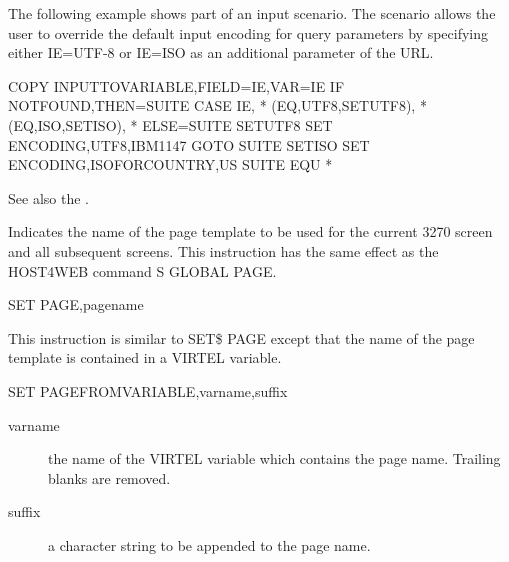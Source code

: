 \documentclass[letterpaper,10pt,english]{sphinxmanual}
\begin{document}
The following example shows part of an input scenario. The scenario allows the user to override the default input encoding for query parameters by specifying either IE=UTF-8 or IE=ISO as an additional parameter of the URL.

\begin{sphinxVerbatim}[commandchars=\\\{\}]
        COPY\PYGZdl{} INPUT\PYGZhy{}TO\PYGZhy{}VARIABLE,FIELD=\PYGZsq{}IE\PYGZsq{},VAR=\PYGZsq{}IE\PYGZsq{}
        IF\PYGZdl{} NOT\PYGZhy{}FOUND,THEN=SUITE
        CASE\PYGZdl{} \PYGZsq{}IE\PYGZsq{}, *
            (EQ,\PYGZsq{}UTF\PYGZhy{}8\PYGZsq{},SETUTF8),                      *
            (EQ,\PYGZsq{}ISO\PYGZsq{},SETISO), *
            ELSE=SUITE
SETUTF8 SET\PYGZdl{} ENCODING,UTF\PYGZhy{}8,\PYGZsq{}IBM1147\PYGZsq{}
        GOTO\PYGZdl{} SUITE
SETISO  SET\PYGZdl{} ENCODING,ISO\PYGZhy{}FOR\PYGZhy{}COUNTRY,\PYGZsq{}US\PYGZsq{}
SUITE   EQU *
\end{sphinxVerbatim}

See also the {\hyperref[\detokenize{User_Guide:v457ug-set-url-encoding}]{}}.


Indicates the name of the page template to be used for the current 3270 screen and all subsequent screens. This instruction has the same effect as the HOST4WEB command S GLOBAL PAGE.

\begin{sphinxVerbatim}[commandchars=\\\{\}]
SET\PYGZdl{} PAGE,\PYGZsq{}pagename\PYGZsq{}
\end{sphinxVerbatim}


This instruction is similar to SET\$ PAGE except that the name of the page template is contained in a VIRTEL variable.

\begin{sphinxVerbatim}[commandchars=\\\{\}]
SET\PYGZdl{} PAGE\PYGZhy{}FROM\PYGZhy{}VARIABLE,\PYGZsq{}varname\PYGZsq{},\PYGZsq{}suffix\PYGZsq{}
\end{sphinxVerbatim}
\begin{description}
\item[{varname}] \leavevmode
the name of the VIRTEL variable which contains the page name. Trailing blanks are removed.

\item[{suffix}] \leavevmode
a character string to be appended to the page name.

\end{description}
\end{document}
